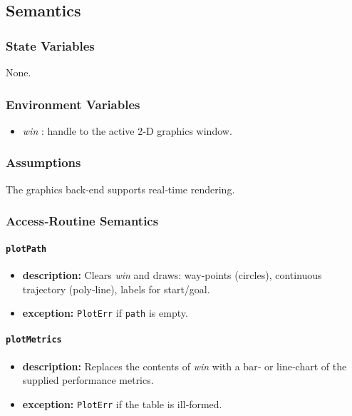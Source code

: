 \documentclass[12pt, titlepage]{article}
\begin{document}
\subsection{Semantics}
\subsubsection{State Variables}
None.

\subsubsection{Environment Variables}
\begin{itemize}
  \item \textit{win} : handle to the active 2‑D graphics window.
\end{itemize}

\subsubsection{Assumptions}
The graphics back‑end supports real‑time rendering.

\subsubsection{Access‑Routine Semantics}

\paragraph{\texttt{plotPath}}
\begin{itemize}
  \item \textbf{description:} Clears \textit{win} and draws:
        way‑points (circles), continuous trajectory (poly‑line),
        labels for start/goal.
  \item \textbf{exception:} \texttt{PlotErr} if \texttt{path} is empty.
\end{itemize}

\paragraph{\texttt{plotMetrics}}
\begin{itemize}
  \item \textbf{description:} Replaces the contents of \textit{win} with a bar‑
        or line‑chart of the supplied performance metrics.
  \item \textbf{exception:} \texttt{PlotErr} if the table is ill‑formed.
\end{itemize}
\end{document}
